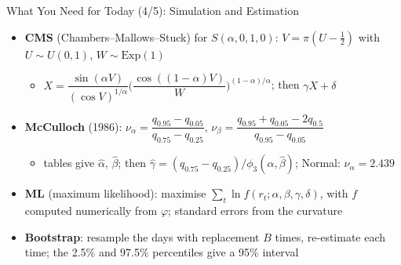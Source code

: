 \begin{frame}{What You Need for Today (4/5): Simulation and Estimation}
\itemsize{\small}
\begin{itemize}
    \item \textbf{CMS} (Chambers--Mallows--Stuck) for $S(\alpha, 0, 1, 0)$: $V = \pi(U - \frac12)$ with $U \sim U(0, 1)$, $W \sim \mathrm{Exp}(1)$
    \begin{itemize}
        \item $X = \dfrac{\sin(\alpha V)}{(\cos V)^{1/\alpha}}\Big(\dfrac{\cos((1-\alpha)V)}{W}\Big)^{(1-\alpha)/\alpha}$; then $\gamma X + \delta$
    \end{itemize}
    \item \textbf{McCulloch} (1986): $\nu_\alpha = \dfrac{q_{0.95} - q_{0.05}}{q_{0.75} - q_{0.25}}$, $\nu_\beta = \dfrac{q_{0.95} + q_{0.05} - 2q_{0.5}}{q_{0.95} - q_{0.05}}$
    \begin{itemize}
        \item tables give $\hat\alpha$, $\hat\beta$; then $\hat\gamma = (q_{0.75} - q_{0.25})/\phi_3(\hat\alpha, \hat\beta)$; Normal: $\nu_\alpha = 2.439$
    \end{itemize}
    \item \textbf{ML} (maximum likelihood): maximise $\sum_t \ln f(r_t; \alpha, \beta, \gamma, \delta)$, with $f$ computed numerically from $\varphi$; standard errors from the curvature
    \item \textbf{Bootstrap}: resample the days with replacement $B$ times, re-estimate each time; the 2.5\% and 97.5\% percentiles give a 95\% interval
\end{itemize}
\end{frame}

